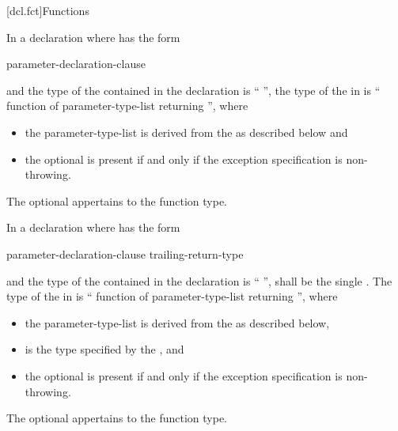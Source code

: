 [dcl.fct]{Functions}%

\pnum
{}%
In a declaration
where
has the form
\begin{ncsimplebnf}
 \terminal{(} parameter-declaration-clause \terminal{)} \br
\bnfindent{}  
\end{ncsimplebnf}
and the type of the contained
in the declaration
is
``
'',
the type of the
in
is
``
function of parameter-type-list
 
returning '', where
\begin{itemize}
\item
the parameter-type-list is derived from
the  as described below and
\item
the optional  is present if and only if
the exception specification is non-throwing.
\end{itemize}
The optional 
appertains to the function type.

\pnum
In a declaration
where
has the form
\begin{ncsimplebnf}
 \terminal{(} parameter-declaration-clause \terminal{)} \br
\bnfindent{}   trailing-return-type
\end{ncsimplebnf}
and the type of the contained
in the declaration
is
`` '',
 shall be the single  .
The type of the
in
is
``
function of parameter-type-list
 
returning '', where
\begin{itemize}
\item
the parameter-type-list is derived from
the  as described below,
\item
{} is the type specified by the , and
\item
the optional  is present if and only if
the exception specification is non-throwing.
\end{itemize}
The optional 
appertains to the function type.


